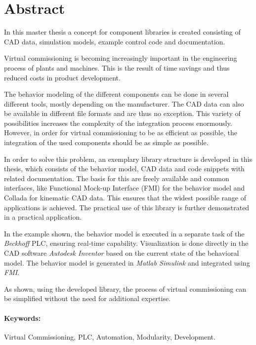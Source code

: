 \section*{Abstract}

In this master thesis a concept for component libraries is created consisting of CAD data, simulation models, example control code and documentation. 

Virtual commissioning is becoming increasingly important in the engineering process of plants and machines. This is the result of time savings and thus reduced costs in product development.

The behavior modeling of the different components can be done in several different tools, mostly depending on the manufacturer. The CAD data can also be available in different file formats and are thus no exception. This variety of possibilities increases the complexity of the integration process enormously. However, in order for virtual commissioning to be as efficient as possible, the integration of the used components should be as simple as possible.

In order to solve this problem, an exemplary library structure is developed in this thesis, which consists of the behavior model, CAD data and code snippets with related documentation. The basis for this are freely available and common interfaces, like Functional Mock-up Interface (FMI) for the behavior model and Collada for kinematic CAD data. This ensures that the widest possible range of applications is achieved. The practical use of this library is further demonstrated in a practical application. 

In the example shown, the behavior model is executed in a separate task of the \textit{Beckhoff} PLC, ensuring real-time capability. Visualization is done directly in the CAD software \textit{Autodesk Inventor} based on the current state of the behavioral model. The behavior model is generated in \textit{Matlab Simulink} and integrated using \textit{FMI}.


As shown, using the developed library, the process of virtual commissioning can be simplified without the need for additional expertise.  


\paragraph*{Keywords:} Virtual Commissioning, PLC, Automation, Modularity, Development.